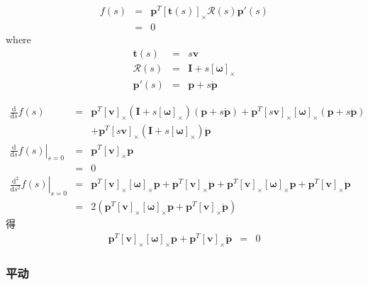 \documentclass{beamer}
\newcommand{\mathd}{\mathrm{d}}
\newcommand{\tmmathbf}[1]{\ensuremath{\boldsymbol{#1}}}
\begin{document}
{{\begin{frame}
\begin{eqnarray*}
    f (s) & = & \tmmathbf{p}^T [\tmmathbf{t} (s)]_{\times} \mathcal{R} (s)
    \tmmathbf{p}' (s)\\
    & = & 0
  \end{eqnarray*}
  where
  \begin{eqnarray*}
    \tmmathbf{t} (s) & = & s\tmmathbf{v}\\
    \mathcal{R} (s) & = & \tmmathbf{I}+ s [\tmmathbf{\omega}]_{\times}\\
    \tmmathbf{p}' (s) & = & \tmmathbf{p}+ s \dot{\tmmathbf{p}}
  \end{eqnarray*}
\end{frame}}{\begin{frame}
  
  \begin{eqnarray*}
    \frac{\mathd}{\mathd s} f (s) & = & \tmmathbf{p}^T [\tmmathbf{v}]_{\times}
    (\tmmathbf{I}+ s [\tmmathbf{\omega}]_{\times}) (\tmmathbf{p}+ s
    \dot{\tmmathbf{p}}) +\tmmathbf{p}^T [s\tmmathbf{v}]_{\times}
    [\tmmathbf{\omega}]_{\times} (\tmmathbf{p}+ s \dot{\tmmathbf{p}})\\
    &  & +\tmmathbf{p}^T [s\tmmathbf{v}]_{\times} (\tmmathbf{I}+ s
    [\tmmathbf{\omega}]_{\times}) \dot{\tmmathbf{p}}\\
    \left. \frac{\mathd}{\mathd s} f (s) \right|_{s = 0} & = & \tmmathbf{p}^T
    [\tmmathbf{v}]_{\times} \tmmathbf{p}\\
    & = & 0\\
    \left. \frac{\mathd^2}{\mathd s^2} f (s) \right|_{s = 0} & = &
    \tmmathbf{p}^T [\tmmathbf{v}]_{\times} [\tmmathbf{\omega}]_{\times}
    \tmmathbf{p}+\tmmathbf{p}^T [\tmmathbf{v}]_{\times} \dot{\tmmathbf{p}}
    +\tmmathbf{p}^T [\tmmathbf{v}]_{\times} [\tmmathbf{\omega}]_{\times}
    \tmmathbf{p}+\tmmathbf{p}^T [\tmmathbf{v}]_{\times} \dot{\tmmathbf{p}}\\
    & = & 2 (\tmmathbf{p}^T [\tmmathbf{v}]_{\times}
    [\tmmathbf{\omega}]_{\times} \tmmathbf{p}+\tmmathbf{p}^T
    [\tmmathbf{v}]_{\times} \dot{\tmmathbf{p}})
  \end{eqnarray*}
  得
  \begin{eqnarray*}
    \tmmathbf{p}^T [\tmmathbf{v}]_{\times} [\tmmathbf{\omega}]_{\times}
    \tmmathbf{p}+\tmmathbf{p}^T [\tmmathbf{v}]_{\times} \dot{\tmmathbf{p}} & =
    & 0
  \end{eqnarray*}
\end{frame}}{\begin{frame}
  \frametitle{平动}
  

\end{frame}}}
\end{document}
